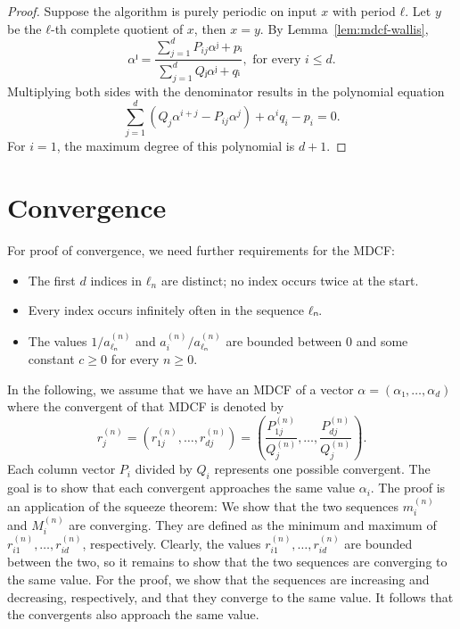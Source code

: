 \begin{proof}
  Suppose the algorithm is purely periodic on input $x$ with period $ℓ$.
  Let $y$ be the $ℓ$-th complete quotient of $x$, then $x = y$.
  By Lemma~\ref{lem:mdcf-wallis},
  \[
    αⁱ = \frac{\sum_{j=1}^d P_{ij} αʲ + pᵢ}{\sum_{j=1}^d Qⱼ αʲ + qᵢ}, \text{ for every } i ≤ d.
  \]
  Multiplying both sides with the denominator results in the polynomial equation
  \[
    \sum_{j=1}^d (Q_j α^{i+j} - P_{ij} α^j) + α^i q_i - p_i = 0.
  \]
  For $i = 1$, the maximum degree of this polynomial is $d + 1$.
\end{proof}

\section{Convergence}

For proof of convergence, we need further requirements for the MDCF:
\begin{itemize}
  \item The first $d$ indices in $ℓ_n$ are distinct; no index occurs twice at the start.
  \item Every index occurs infinitely often in the sequence $ℓₙ$.
  \item The values $1/a_{ℓₙ}^{(n)}$ and $a_i^{(n)}/a_{ℓₙ}^{(n)}$ are bounded
    between $0$ and some constant $c ≥ 0$ for every $n ≥ 0$.
\end{itemize}
In the following, we assume that we have an MDCF of a vector $α = (α₁, …, α_d)$
where the convergent of that MDCF is denoted by
\[
  r_j^{(n)} = (r_{1j}^{(n)}, …, r_{dj}^{(n)}) = \left(  \frac{P_{1j}^{(n)}}{Q_j^{(n)}}, \dots, \frac{P_{dj}^{(n)}}{Q_j^{(n)}} \right).
\]
Each column vector $P_i$ divided by $Q_i$ represents one possible convergent.
The goal is to show that each convergent approaches the same value $α_i$.
The proof is an application of the squeeze theorem:
We show that the two sequences $m_i^{(n)}$ and $M_i^{(n)}$ are converging.
They are defined as the minimum and maximum of $r_{i1}^{(n)}, …, r_{id}^{(n)}$, respectively.
Clearly, the values $r_{i1}^{(n)}, …, r_{id}^{(n)}$ are bounded between the two,
so it remains to show that the two sequences are converging to the same value.
For the proof, we show that the sequences are increasing and decreasing, respectively,
and that they converge to the same value.
It follows that the convergents also approach the same value.

